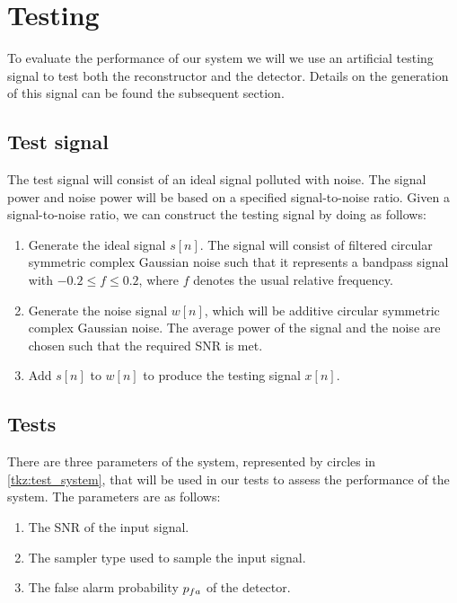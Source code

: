 \documentclass[a4paper, openany, oneside]{memoir}
\begin{document}
\section{Testing}
To evaluate the performance of our system we will we use an artificial testing signal to test both the reconstructor and the detector.
Details on the generation of this signal can be found the subsequent section.

\subsection{Test signal}\label{ssec:test_signal}
The test signal will consist of an ideal signal polluted with noise. The signal power and noise power will be based on a specified signal-to-noise ratio. Given a signal-to-noise ratio, we can construct the testing signal by doing as follows:

\begin{enumerate}
	\item Generate the ideal signal $s[n]$. The signal will consist of filtered circular symmetric complex Gaussian noise such that it represents a bandpass signal with $-0.2 \leq f\leq 0.2$, where $f$ denotes the usual relative frequency.
	\item Generate the noise signal $w[n]$, which will be additive circular symmetric complex Gaussian noise. The average power of the signal and the noise are chosen such that the required SNR is met. 
	\item Add $s[n]$ to $w[n]$ to produce the testing signal $x[n]$.
\end{enumerate}

\subsection{Tests}
There are three parameters of the system, represented by circles in \cref{tkz:test_system}, that will be used in our tests to assess the performance of the system. The parameters are as follows:
\begin{enumerate}
	\item The SNR of the input signal.
	\item The sampler type used to sample the input signal.
	\item The false alarm probability $p\ss{fa}$ of the detector.
\end{enumerate}
\end{document}
